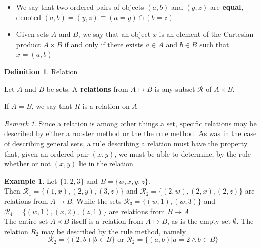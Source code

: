 \documentclass{book}
\theoremstyle{definition}
\newtheorem{definition}{Definition}[section]
\newtheorem{example}{Example}[definition]
\theoremstyle{remark}
\newtheorem{remark}{Remark}
\newcommand{\cc}[1]{\mathcal{#1}}
\begin{document}
        \begin{itemize}
            \item We say that two ordered pairs of objects $(a,b)$ and $(y,z)$ are \textbf{equal}, denoted
            $(a,b)=(y,z) \equiv (a=y) \cap (b=z)$
            \item Given sets $A$ and $B$, we say that an object $x$ is an element of the Cartesian product $A \times B$ if and only if there exists $a \in A$ and $b \in B$ such that $x = (a,b)$
        \end{itemize}
    
    
    \begin{definition}
    Relation \\   
        \begin{tcolorbox}
            Let $A$ and $B$ be sets. A \textbf{relations} from $A \mapsto B$ is any subset $\cc{R}$ of $A \times B$. \\
                \begin{center}
                    If $A = B$, we say that $R$ is a relation on $A$
                \end{center}
        \end{tcolorbox}
    \end{definition}
    
    \begin{remark}
        Since a relation is among other things a set, specific relations may be described by either a rooster method or the the rule method. As was in the case of describing general sets, a rule describing a relation must have the property that, given an ordered pair $(x,y)$, we must be able to determine, by the rule whether or not $(x,y)$ lie in the relation
    \end{remark}
    
    \begin{example}
    Let $\{ 1,2,3 \}$ and $B = \{w,x,y,z \}$. \\
    
    Then $\cc{R}_1 = \{ (1,x), (2,y), (3,z) \}$ and $\cc{R}_2 = \{ (2,w), (2,x), (2,z) \}$ are relations from $A \mapsto B$. While the sets $\cc{R}_3 = \{ (w,1), (w,3) \}$ and $\cc{R}_4 = \{ (w,1), (x,2), (z,1) \}$ are relations from $B \mapsto A$. \\
    
    The entire set $A \times B$ itself is a relation from $A \mapsto B$, as is the empty set $\emptyset$. The relation $R_2$ may be described by the rule method, namely
        \begin{equation*}
            \cc{R}_2 = \{ (2,b) | b \in B \} \text{ or } \cc{R}_2 = \{ (a,b) | a=2 \wedge b \in B \}
        \end{equation*}
    \end{example}
    
\end{document}
